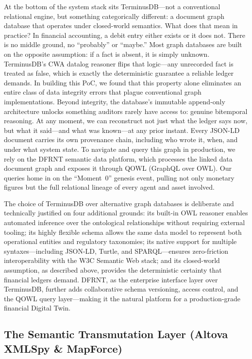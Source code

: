\documentclass[12pt, a4paper]{article}
\begin{document}
At the bottom of the system stack sits TerminusDB---not a conventional relational engine, but something categorically different: a document graph database that operates under closed-world semantics. What does that mean in practice? In financial accounting, a debit entry either exists or it does not. There is no middle ground, no ``probably'' or ``maybe.'' Most graph databases are built on the opposite assumption: if a fact is absent, it is simply unknown. TerminusDB's CWA datalog reasoner flips that logic---any unrecorded fact is treated as false, which is exactly the deterministic guarantee a reliable ledger demands. In building this PoC, we found that this property alone eliminates an entire class of data integrity errors that plague conventional graph implementations. Beyond integrity, the database's immutable append-only architecture unlocks something auditors rarely have access to: genuine bitemporal reasoning. At any moment, we can reconstruct not just what the ledger says now, but what it said---and what was known---at any prior instant. Every JSON-LD document carries its own provenance chain, including who wrote it, when, and under what system state. To navigate and query this graph in production, we rely on the DFRNT semantic data platform, which processes the linked data document graph and exposes it through QOWL (GraphQL over OWL). Our queries home in on the ``Moment~0'' genesis event, pulling not only monetary figures but the full relational lineage of every agent and asset involved.

The choice of TerminusDB over alternative graph databases is deliberate and technically justified on four additional grounds: its built-in OWL reasoner enables automated inference over the ontological relationships without requiring external tooling; its highly flexible schema allows the same data model to represent both operational entities and regulatory taxonomies; its native support for multiple syntaxes---including JSON-LD, Turtle, and SPARQL---ensures zero-friction interoperability with the W3C Semantic Web stack; and its closed-world assumption, as described above, provides the deterministic certainty that financial ledgers demand. DFRNT, as the enterprise interface layer over TerminusDB, further adds collaborative schema versioning, access control, and the QOWL query layer---making it the natural platform for a production-grade financial Digital Twin.

\subsection{The Semantic Transmutation Layer (Altova XMLSpy \& MapForce)}
\end{document}
